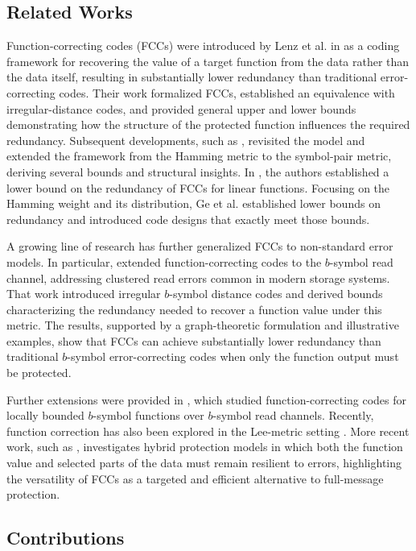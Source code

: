 \documentclass[11 pt]{article}
\numberwithin{equation}{section}
\begin{document}
 \subsection{Related Works}
    Function-correcting codes (FCCs) were introduced by Lenz et al. in \cite{10132545} as a coding framework for recovering the value of a target function from the data rather than the data itself, resulting in substantially lower redundancy than traditional error-correcting codes. Their work formalized FCCs, established an equivalence with irregular-distance codes, and provided general upper and lower bounds demonstrating how the structure of the protected function influences the required redundancy. Subsequent developments, such as \cite{Xia2023}, revisited the model and extended the framework from the Hamming metric to the symbol-pair metric, deriving several bounds and structural insights. In \cite{Premlal2024}, the authors established a lower bound on the redundancy of FCCs for linear functions. Focusing on the Hamming weight and its distribution, Ge et al. \cite{Ge2025} established lower bounds on redundancy and introduced code designs that exactly meet those bounds.

    A growing line of research has further generalized FCCs to non-standard error models. In particular, \cite{Singh2025} extended function-correcting codes to the $b$-symbol read channel, addressing clustered read errors common in modern storage systems. That work introduced irregular $b$-symbol distance codes and derived bounds characterizing the redundancy needed to recover a function value under this metric. The results, supported by a graph-theoretic formulation and illustrative examples, show that FCCs can achieve substantially lower redundancy than traditional $b$-symbol error-correcting codes when only the function output must be protected.

    Further extensions were provided in \cite{11250740}, which studied function-correcting codes for locally bounded $b$-symbol functions over $b$-symbol read channels. Recently, function correction has also been explored in the Lee-metric setting \cite{rajan2025plotkin, Verma2025FCCL}. More recent work, such as \cite{rajput2025function}, investigates hybrid protection models in which both the function value and selected parts of the data must remain resilient to errors, highlighting the versatility of FCCs as a targeted and efficient alternative to full-message protection.

    \subsection{Contributions}
\end{document}
